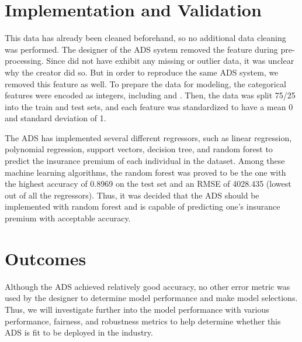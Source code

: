 \documentclass[10pt]{article}
\newcommand{\code}[1]{{\color{black}{\texttt{#1}}}} %
\begin{document}
\section{Implementation and Validation}


This data has already been cleaned beforehand, so no additional data cleaning was performed. The designer of the ADS system removed the feature \code{region} during pre-processing. Since \code{region} did not have exhibit any missing or outlier data, it was unclear why the creator did so.  But in order to reproduce the same ADS system, we removed this feature as well. To prepare the data for modeling, the categorical features were encoded as integers, including \code{sex} and \code{smoker}. Then, the data was split 75/25 into the train and test sets, and each feature was standardized to have a mean 0 and standard deviation of 1. 

The ADS has implemented several different regressors, such as linear regression, polynomial regression, support vectors, decision tree, and random forest to predict the insurance premium of each individual in the dataset. Among these machine learning algorithms, the random forest was proved to be the one with the highest accuracy of 0.8969 on the test set and an RMSE of 4028.435 (lowest out of all the regressors). Thus, it was decided that the ADS should be implemented with random forest and is capable of predicting one's insurance premium with acceptable accuracy. 

\section{Outcomes}


Although the ADS achieved relatively good accuracy, no other error metric was used by the designer to determine model performance and make model selections. Thus, we will investigate further into the model performance with various performance, fairness, and robustness metrics to help determine whether this ADS is fit to be deployed in the industry.
\end{document}
